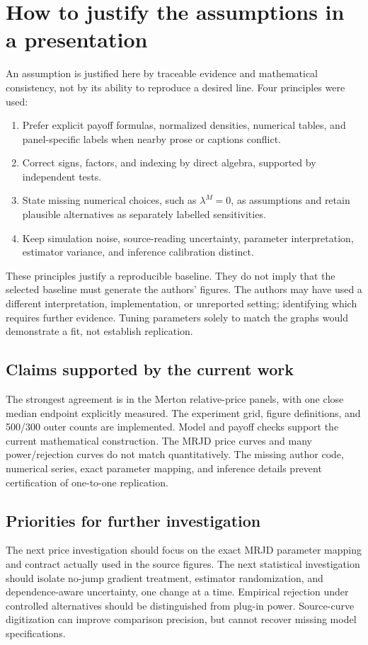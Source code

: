 \documentclass[11pt,a4paper]{article}
\begin{document}
\clearpage
\section{How to justify the assumptions in a presentation}
An assumption is justified here by traceable evidence and mathematical
consistency, not by its ability to reproduce a desired line. Four
principles were used:
\begin{enumerate}
\item Prefer explicit payoff formulas, normalized densities, numerical
tables, and panel-specific labels when nearby prose or captions conflict.
\item Correct signs, factors, and indexing by direct algebra, supported
by independent tests.
\item State missing numerical choices, such as $\lambda^M=0$, as assumptions
and retain plausible alternatives as separately labelled sensitivities.
\item Keep simulation noise, source-reading uncertainty, parameter
interpretation, estimator variance, and inference calibration distinct.
\end{enumerate}

These principles justify a reproducible baseline. They do not imply that
the selected baseline must generate the authors' figures. The authors
may have used a different interpretation, implementation, or unreported
setting; identifying which requires further evidence. Tuning parameters
solely to match the graphs would demonstrate a fit, not establish replication.

\subsection{Claims supported by the current work}
The strongest agreement is in the Merton relative-price panels, with
one close median endpoint explicitly measured. The experiment grid,
figure definitions, and 500/300 outer counts are implemented. Model
and payoff checks support the current mathematical construction.
The MRJD price curves and many power/rejection curves do not match
quantitatively. The missing author code, numerical series, exact parameter
mapping, and inference details prevent certification of one-to-one replication.

\subsection{Priorities for further investigation}
The next price investigation should focus on the exact MRJD parameter
mapping and contract actually used in the source figures. The next
statistical investigation should isolate no-jump gradient treatment,
estimator randomization, and dependence-aware uncertainty, one change
at a time. Empirical rejection under controlled alternatives should be
distinguished from plug-in power. Source-curve digitization can improve
comparison precision, but cannot recover missing model specifications.
\end{document}
